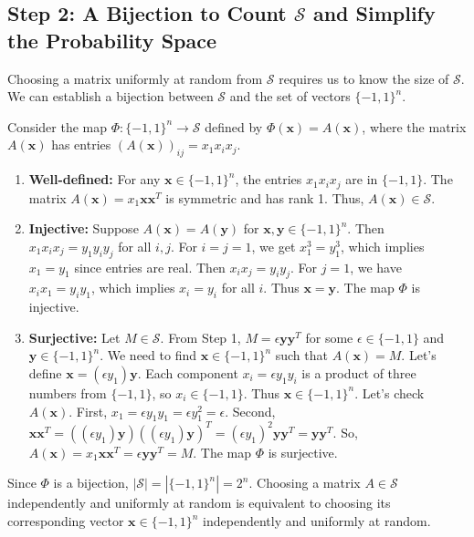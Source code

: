 \documentclass[12pt,a4paper]{article}
\theoremstyle{definition}
\begin{document}
        \subsection*{Step 2: A Bijection to Count $\mathcal{S}$ and Simplify the Probability Space}

        Choosing a matrix uniformly at random from $\mathcal{S}$ requires us to know the size of $\mathcal{S}$. We can establish a bijection between $\mathcal{S}$ and the set of vectors $\{-1, 1\}^n$.

        Consider the map $\Phi: \{-1, 1\}^n \to \mathcal{S}$ defined by $\Phi(\mathbf{x}) = A(\mathbf{x})$, where the matrix $A(\mathbf{x})$ has entries $(A(\mathbf{x}))_{ij} = x_1 x_i x_j$.
        \begin{enumerate}
            \item \textbf{Well-defined:} For any $\mathbf{x} \in \{-1, 1\}^n$, the entries $x_1 x_i x_j$ are in $\{-1, 1\}$. The matrix $A(\mathbf{x}) = x_1 \mathbf{x}\mathbf{x}^T$ is symmetric and has rank 1. Thus, $A(\mathbf{x}) \in \mathcal{S}$.
            \item \textbf{Injective:} Suppose $A(\mathbf{x}) = A(\mathbf{y})$ for $\mathbf{x}, \mathbf{y} \in \{-1, 1\}^n$. Then $x_1 x_i x_j = y_1 y_i y_j$ for all $i,j$. For $i=j=1$, we get $x_1^3 = y_1^3$, which implies $x_1 = y_1$ since entries are real. Then $x_i x_j = y_i y_j$. For $j=1$, we have $x_i x_1 = y_i y_1$, which implies $x_i = y_i$ for all $i$. Thus $\mathbf{x}=\mathbf{y}$. The map $\Phi$ is injective.
            \item \textbf{Surjective:} Let $M \in \mathcal{S}$. From Step 1, $M = \epsilon \mathbf{y}\mathbf{y}^T$ for some $\epsilon \in \{-1, 1\}$ and $\mathbf{y} \in \{-1, 1\}^n$. We need to find $\mathbf{x} \in \{-1, 1\}^n$ such that $A(\mathbf{x}) = M$. Let's define $\mathbf{x} = (\epsilon y_1) \mathbf{y}$. Each component $x_i = \epsilon y_1 y_i$ is a product of three numbers from $\{-1, 1\}$, so $x_i \in \{-1, 1\}$. Thus $\mathbf{x} \in \{-1, 1\}^n$. Let's check $A(\mathbf{x})$. First, $x_1 = \epsilon y_1 y_1 = \epsilon y_1^2 = \epsilon$. Second, $\mathbf{x}\mathbf{x}^T = ((\epsilon y_1)\mathbf{y})((\epsilon y_1)\mathbf{y})^T = (\epsilon y_1)^2 \mathbf{y}\mathbf{y}^T = \mathbf{y}\mathbf{y}^T$. So, $A(\mathbf{x}) = x_1 \mathbf{x}\mathbf{x}^T = \epsilon \mathbf{y}\mathbf{y}^T = M$. The map $\Phi$ is surjective.
        \end{enumerate}

        Since $\Phi$ is a bijection, $|\mathcal{S}| = |\{-1, 1\}^n| = 2^n$. Choosing a matrix $A \in \mathcal{S}$ independently and uniformly at random is equivalent to choosing its corresponding vector $\mathbf{x} \in \{-1, 1\}^n$ independently and uniformly at random.
\end{document}
